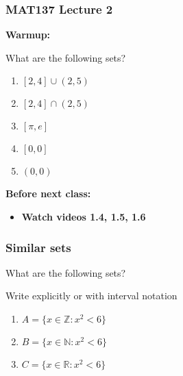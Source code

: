 \documentclass[14pt]{beamer}
\date{}
\title{}
\author{}
\newcommand {\DS} [1] {${\displaystyle #1}$}
\newcommand {\R}{\mathbb{R}}
\newcommand {\Z}{\mathbb{Z}}
\newcommand {\N}{\mathbb{N}}
\begin{document}



\begin{frame}
\frametitle{MAT137 Lecture 2}

\textbf{Warmup:}
\vfill

What are the following sets?

\begin{enumerate} 
	\item  $[2,4] \cup (2,5)$
	\item  $[2,4] \cap (2,5)$
	\item  $[\pi,e]$
	\item  $[0,0]$
	\item  $(0,0)$
\end{enumerate}

	\vfill
	{\bf Before next class:}
		\begin{itemize} \normalsize
			\item {\bf Watch videos 1.4, 1.5, 1.6 }
		\end{itemize}
	\vfill
\end{frame}




\begin{frame}
\frametitle{Similar sets}

What are the following sets? 

	{\small Write explicitly or with interval notation}

	\bigskip
	\begin{enumerate} 
		\item  \DS{A = \{ x \in \Z : x^2 < 6\} }
		\item  \DS{B = \{ x \in \N : x^2 < 6\} }
		\item  \DS{C = \{ x \in \R : x^2 < 6\} }
	\end{enumerate}
\end{frame}

\end{document}
